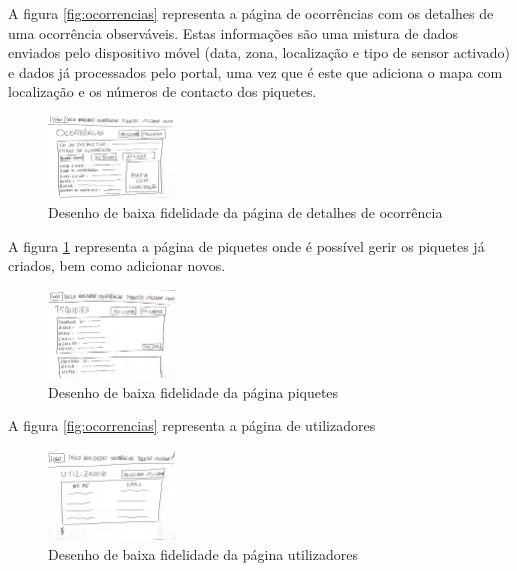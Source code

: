 A figura \ref{fig:ocorrencias} representa a página de ocorrências com os detalhes de uma ocorrência observáveis. Estas informações são uma mistura de dados enviados pelo dispositivo móvel (data, zona, localização e tipo de sensor activado) e dados já processados pelo portal, uma vez que é este que adiciona o mapa com localização e os números de contacto dos piquetes.

\begin{figure}[!htb]
	\centering
	\includegraphics[width=0.3\textwidth, frame]{figuras/storyboard/frame_4.jpg}
	\caption{Desenho de baixa fidelidade da página de detalhes de ocorrência}
	\label{fig:ocorrência_detalhes}
\end{figure}

A figura \ref{fig:ocorrência_detalhes} representa a página de piquetes onde é possível gerir os piquetes já criados, bem como adicionar novos.

\begin{figure}[!htb]
	\centering
	\includegraphics[width=0.3\textwidth, frame]{figuras/storyboard/frame_5.jpg}
	\caption{Desenho de baixa fidelidade da página piquetes}
	\label{fig:piquetes}
\end{figure}

A figura \ref{fig:ocorrencias} representa a página de utilizadores

\begin{figure}[!htb]
	\centering
	\includegraphics[width=0.3\textwidth, frame]{figuras/storyboard/frame_6.jpg}
	\caption{Desenho de baixa fidelidade da página utilizadores}
	\label{fig:utilizadores}
\end{figure}



